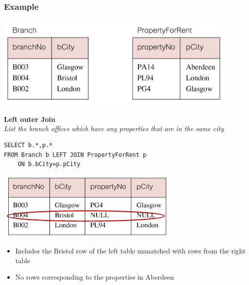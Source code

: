 \documentclass{article}[18pt]
\begin{document}
\subsubsection{Example}
\begin{center}
	\includegraphics[scale=0.7]{example}
\end{center}
\textbf{Left outer Join}\\
\textit{List the branch offices which have any properties that are in the same city}
\begin{verbatim}
SELECT b.*,p.*
FROM Branch b LEFT JOIN PropertyForRent p
	ON b.bCity=p.pCity
\end{verbatim}
\begin{center}
	\includegraphics[scale=0.7]{"Left Outer"}
\end{center}
\begin{itemize}
	\item Includes the Bristol row of the left table unmatched with rows from the right table
	\item No rows corresponding to the properties in Aberdeen
\end{itemize}
\end{document}
